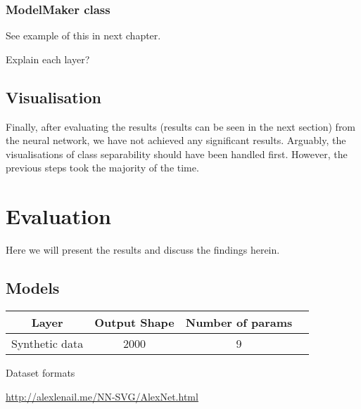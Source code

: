 \subsection{ModelMaker class}
See example of this in next chapter. 

Explain each layer?


\section{Visualisation}
Finally, after evaluating the results (results can be seen in the next section) from the neural network, we have not achieved any significant results. Arguably, the visualisations of class separability should have been handled first. However, the previous steps took the majority of the time.

\chapter{Evaluation}
Here we will present the results and discuss the findings herein.


\section{Models}
\begin{table}[H]
	\centering
	 \label{tab:title2} 
	\begin{tabular}{|c|c|c| c|} \hline
		\textbf{Layer} & \textbf{Output Shape } & \textbf{Number of params} \\ \hline \hline 
		Synthetic data & 2000 &  9  \\ \hline 

	\end{tabular}
	\par \bigskip Dataset formats
	\label{datasets}
\end{table}

\url{http://alexlenail.me/NN-SVG/AlexNet.html}

